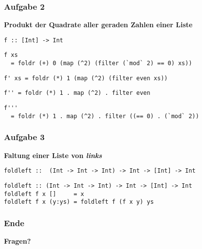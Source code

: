 \documentclass{beamer}
\begin{document}
\begin{frame}[t, fragile] \frametitle{Aufgabe 2}
	\footnotesize
	\textbf{Produkt der Quadrate aller geraden Zahlen einer Liste} \\[6pt]
	\begin{lstlisting}[style=bg]
f :: [Int] -> Int
	\end{lstlisting}
	
	\pause \bigskip 
	
	\begin{lstlisting}[style=bg]
f xs 
  = foldr (+) 0 (map (^2) (filter (`mod` 2) == 0) xs))
	\end{lstlisting}
	\pause
	\begin{lstlisting}[style=bg]
f' xs = foldr (*) 1 (map (^2) (filter even xs))
	\end{lstlisting}
	\pause
	\begin{lstlisting}[style=bg]
f'' = foldr (*) 1 . map (^2) . filter even
	\end{lstlisting}
	\begin{lstlisting}[style=bg]
f''' 
  = foldr (*) 1 . map (^2) . filter ((== 0) . (`mod` 2))
	\end{lstlisting}
\end{frame}




\begin{frame}[t, fragile] \frametitle{Aufgabe 3}
	\textbf{Faltung einer Liste von \textit{links}} \\[6pt]
	\begin{lstlisting}[style=bg]
foldleft ::  (Int -> Int -> Int) -> Int -> [Int] -> Int
	\end{lstlisting}
	
	
	\pause \bigskip
	
	\begin{lstlisting}[style=bg]
foldleft :: (Int -> Int -> Int) -> Int -> [Int] -> Int
foldleft f x []     = x
foldleft f x (y:ys) = foldleft f (f x y) ys
	\end{lstlisting}
\end{frame}


\begin{frame} \frametitle{Ende}
	\centering
	\textbf{Fragen?}
\end{frame}
\end{document}
